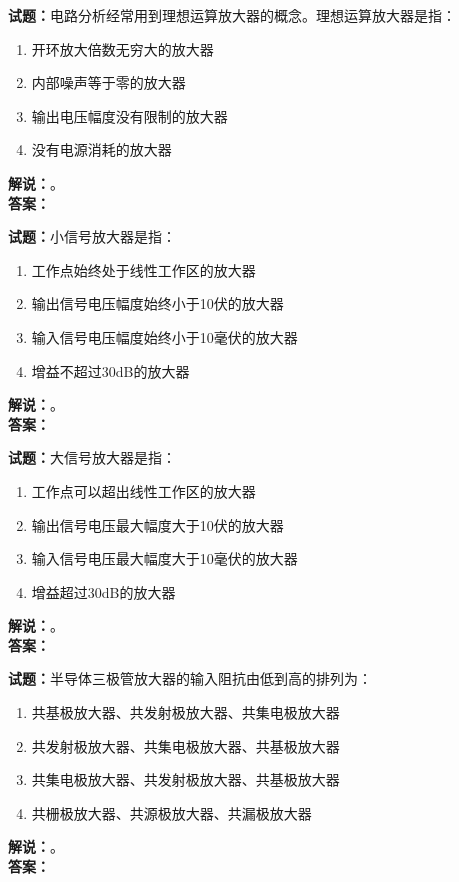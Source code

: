 \documentclass{ctexbook}
\begin{document}
\bigskip

\noindent\textbf{试题：}电路分析经常用到理想运算放大器的概念。理想运算放大器是指：
\begin{enumerate}[leftmargin=3em]
  \item 开环放大倍数无穷大的放大器
  \item 内部噪声等于零的放大器
  \item 输出电压幅度没有限制的放大器
  \item 没有电源消耗的放大器
\end{enumerate}
\noindent\textbf{解说：}\textbf{}。\\\noindent\textbf{答案：}

\bigskip

\noindent\textbf{试题：}小信号放大器是指：
\begin{enumerate}[leftmargin=3em]
  \item 工作点始终处于线性工作区的放大器
  \item 输出信号电压幅度始终小于10伏的放大器
  \item 输入信号电压幅度始终小于10毫伏的放大器
  \item 增益不超过30dB的放大器
\end{enumerate}
\noindent\textbf{解说：}\textbf{}。\\\noindent\textbf{答案：}

\bigskip

\noindent\textbf{试题：}大信号放大器是指：
\begin{enumerate}[leftmargin=3em]
  \item 工作点可以超出线性工作区的放大器
  \item 输出信号电压最大幅度大于10伏的放大器
  \item 输入信号电压最大幅度大于10毫伏的放大器
  \item 增益超过30dB的放大器
\end{enumerate}
\noindent\textbf{解说：}\textbf{}。\\\noindent\textbf{答案：}

\bigskip

\noindent\textbf{试题：}半导体三极管放大器的输入阻抗由低到高的排列为：
\begin{enumerate}[leftmargin=3em]
  \item 共基极放大器、共发射极放大器、共集电极放大器
  \item 共发射极放大器、共集电极放大器、共基极放大器
  \item 共集电极放大器、共发射极放大器、共基极放大器
  \item 共栅极放大器、共源极放大器、共漏极放大器
\end{enumerate}
\noindent\textbf{解说：}\textbf{}。\\\noindent\textbf{答案：}
\end{document}
